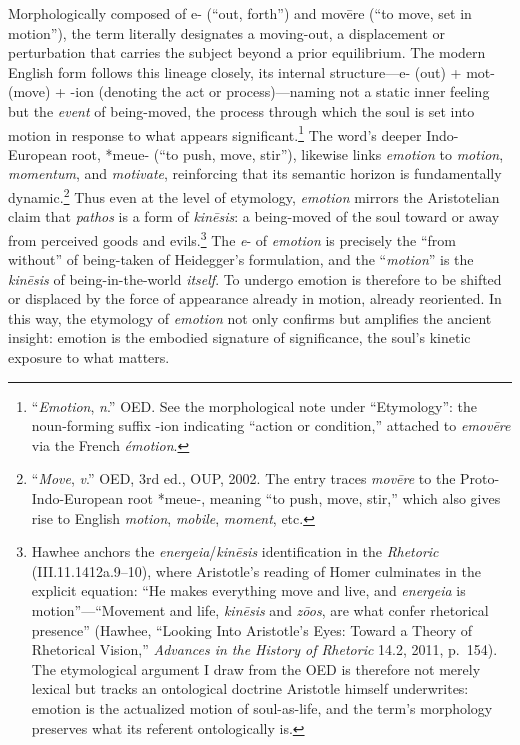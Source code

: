 Morphologically composed of e- (“out, forth”) and movēre (“to move, set in motion”), the term literally designates a moving-out, a displacement or perturbation that carries the subject beyond a prior equilibrium. The modern English form follows this lineage closely, its internal structure—e- (out) + mot- (move) + -ion (denoting the act or process)—naming not a static inner feeling but the \textit{event} of being-moved, the process through which the soul is set into motion in response to what appears significant.\footnote{“\textit{Emotion}, \textit{n}.” OED. See the morphological note under “Etymology”: the noun-forming suffix -ion indicating “action or condition,” attached to \textit{emovēre} via the French \textit{émotion}.} The word’s deeper Indo-European root, *meue- (“to push, move, stir”), likewise links \textit{emotion} to \textit{motion}, \textit{momentum}, and \textit{motivate}, reinforcing that its semantic horizon is fundamentally dynamic.\footnote{“\textit{Move}, \textit{v}.” OED, 3rd ed., OUP, 2002. The entry traces \textit{movēre} to the Proto-Indo-European root *meue-, meaning “to push, move, stir,” which also gives rise to English \textit{motion}, \textit{mobile}, \textit{moment}, etc.}  Thus even at the level of etymology, \textit{emotion} mirrors the Aristotelian claim that \textit{pathos} is a form of \textit{kinēsis}: a being-moved of the soul toward or away from perceived goods and evils.\footnote{Hawhee anchors the \textit{energeia}/\textit{kinēsis} identification in the \textit{Rhetoric} (III.11.1412a.9--10), where Aristotle's reading of Homer culminates in the explicit equation: ``He makes everything move and live, and \textit{energeia} is motion''---``Movement and life, \textit{kinēsis} and \textit{zōos}, are what confer rhetorical presence'' (Hawhee, ``Looking Into Aristotle's Eyes: Toward a Theory of Rhetorical Vision,'' \textit{Advances in the History of Rhetoric} 14.2, 2011, p.~154). The etymological argument I draw from the OED is therefore not merely lexical but tracks an ontological doctrine Aristotle himself underwrites: emotion is the actualized motion of soul-as-life, and the term's morphology preserves what its referent ontologically is.} The \textit{e}- of \textit{emotion} is precisely the ``from without'' of being-taken of Heidegger's formulation, and the ``\textit{motion}'' is the \textit{kinēsis} of being-in-the-world \textit{itself}. To undergo emotion is therefore to be shifted or displaced by the force of appearance already in motion, already reoriented. In this way, the etymology of \textit{emotion} not only confirms but amplifies the ancient insight: emotion is the embodied signature of significance, the soul’s kinetic exposure to what matters. 

